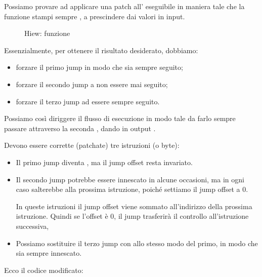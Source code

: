 



\clearpage
{}

Possiamo provare ad applicare una patch all' eseguibile in maniera tale che la funzione  stampi sempre , 
a prescindere dai valori in input.

\begin{figure}[H]
\centering
{}
\caption{Hiew: funzione }
\label{fig:jcc_hiew_1}
\end{figure}

Essenzialmente, per ottenere il risultato desiderato, dobbiamo:
\begin{itemize}
\item forzare il primo jump in modo che sia sempre seguito;
\item forzare il secondo jump a non essere mai seguito;
\item forzare il terzo jump ad essere sempre seguito.
\end{itemize}

Possiamo così diriggere il flusso di esecuzione in modo tale da farlo sempre passare attraverso la seconda \printf, dando in output .

Devono essere corrette (patchate) tre istruzioni (o byte):

\begin{itemize}
\item Il primo jump diventa \JMP, ma il \gls{jump offset} resta invariato.

\item 
Il secondo jump potrebbe essere innescato in alcune occasioni, ma in ogni caso salterebbe alla prossima istruzione, poiché settiamo il \gls{jump offset} a 0.

In queste istruzioni il \gls{jump offset} viene sommato all'indirizzo della prossima istruzione.
Quindi se l'offset è 0, il jump trasferirà il controllo all'istruzione successiva,

\item 
Possiamo sostituire il terzo jump con \JMP allo stesso modo del primo, in modo che sia sempre innescato.

\end{itemize}

\clearpage
Ecco il codice modificato:

